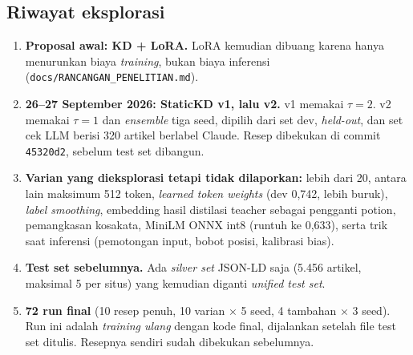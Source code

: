 \documentclass[10pt,a4paper]{article}
\begin{document}
\subsection{Riwayat eksplorasi}
\begin{enumerate}
  \item \textbf{Proposal awal: KD + LoRA.} LoRA kemudian dibuang karena hanya menurunkan biaya \emph{training}, bukan biaya inferensi (\texttt{docs/RANCANGAN\_PENELITIAN.md}).
  \item \textbf{26--27 September 2026: StaticKD v1, lalu v2.} v1 memakai $\tau=2$. v2 memakai $\tau=1$ dan \emph{ensemble} tiga seed, dipilih dari set dev, \emph{held-out}, dan set cek LLM berisi 320 artikel berlabel Claude. Resep dibekukan di commit \texttt{45320d2}, sebelum test set dibangun.
  \item \textbf{Varian yang dieksplorasi tetapi tidak dilaporkan:} lebih dari 20, antara lain maksimum 512 token, \emph{learned token weights} (dev 0,742, lebih buruk), \emph{label smoothing}, embedding hasil distilasi teacher sebagai pengganti potion, pemangkasan kosakata, MiniLM ONNX int8 (runtuh ke 0,633), serta trik saat inferensi (pemotongan input, bobot posisi, kalibrasi bias).
  \item \textbf{Test set sebelumnya.} Ada \emph{silver set} JSON-LD saja (5.456 artikel, maksimal 5 per situs) yang kemudian diganti \emph{unified test set}.
  \item \textbf{72 run final} (10 resep penuh, 10 varian $\times$ 5 seed, 4 tambahan $\times$ 3 seed). Run ini adalah \emph{training ulang} dengan kode final, dijalankan setelah file test set ditulis. Resepnya sendiri sudah dibekukan sebelumnya.
\end{enumerate}
\end{document}
